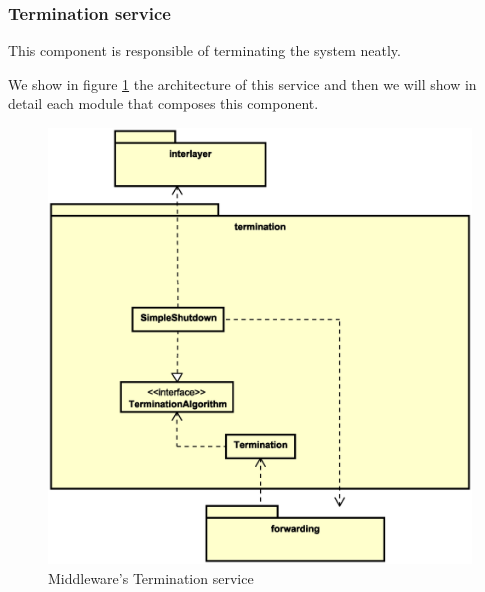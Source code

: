 \subsubsection{Termination service}
This component is responsible of terminating the system neatly.

We show in figure \ref{fig:mw-termination} the architecture of this service and
then we will show in detail each module that composes this component.

\begin{figure}[H]
  \centering
  \includegraphics[width=\columnwidth]{images/solution/mw/termination.eps}
  \caption{Middleware's Termination service}
  \label{fig:mw-termination}
\end{figure}

